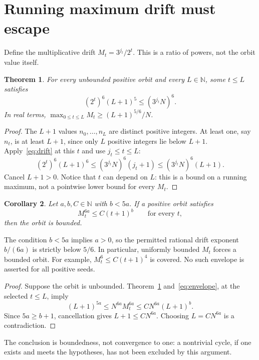 \documentclass[11pt]{article}
\newtheorem{theorem}{Theorem}
\newtheorem{corollary}[theorem]{Corollary}
\begin{document}
\section{Running maximum drift must escape}\label{sec:escape}
Define the multiplicative drift $M_t=3^{j_t}/2^t$. This is a ratio of powers, not the orbit value itself.
\begin{theorem}\label{thm:escape}
For every unbounded positive orbit and every $L\in\mathbb N$, some $t\le L$ satisfies
\begin{equation}\label{eq:escape}
(2^t)^6(L+1)^5\le(3^{j_t}N)^6.
\end{equation}
In real terms, $\max_{0\le t\le L}M_t\ge(L+1)^{5/6}/N$.
\end{theorem}
\begin{proof}
The $L+1$ values $n_0,\ldots,n_L$ are distinct positive integers. At least one, say $n_t$, is at least $L+1$, since only $L$ positive integers lie below $L+1$. Apply~\eqref{eq:drift} at this $t$ and use $j_t\le t\le L$:
\[
(2^t)^6(L+1)^6\le(3^{j_t}N)^6(j_t+1)
\le(3^{j_t}N)^6(L+1).
\]
Cancel $L+1>0$. Notice that $t$ can depend on $L$: this is a bound on a running maximum, not a pointwise lower bound for every $M_t$.
\end{proof}

\begin{corollary}\label{cor:poly}
Let $a,b,C\in\mathbb N$ with $b<5a$. If a positive orbit satisfies
\begin{equation}\label{eq:envelope}
M_t^{6a}\le C(t+1)^b\qquad\text{for every }t,
\end{equation}
then the orbit is bounded.
\end{corollary}
The condition $b<5a$ implies $a>0$, so the permitted rational drift exponent $b/(6a)$ is strictly below $5/6$. In particular, uniformly bounded $M_t$ forces a bounded orbit. For example, $M_t^6\le C(t+1)^4$ is covered. No such envelope is asserted for all positive seeds.

\begin{proof}
Suppose the orbit is unbounded. Theorem~\ref{thm:escape} and~\eqref{eq:envelope}, at the selected $t\le L$, imply
\[
(L+1)^{5a}\le N^{6a}M_t^{6a}
\le C N^{6a}(L+1)^b.
\]
Since $5a\ge b+1$, cancellation gives $L+1\le C N^{6a}$. Choosing $L=C N^{6a}$ is a contradiction.
\end{proof}
The conclusion is boundedness, not convergence to one: a nontrivial cycle, if one exists and meets the hypotheses, has not been excluded by this argument.
\end{document}
